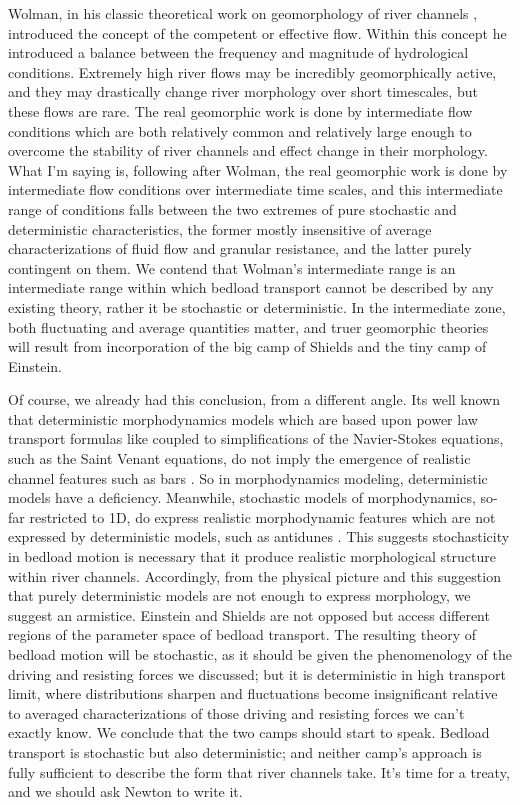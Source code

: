 \documentclass{article}
\begin{document}
Wolman, in his classic theoretical work on geomorphology of river channels \citep{Wolman1968}, introduced the concept of the competent or effective flow. 
Within this concept he introduced a balance between the frequency and magnitude of hydrological conditions. 
Extremely high river flows may be incredibly geomorphically active, and they may drastically change river morphology over short timescales, but these flows are rare. 
The real geomorphic work is done by intermediate flow conditions which are both relatively common and relatively large enough to overcome the stability of river channels and effect change in their morphology. 
What I'm saying is, following after Wolman, the real geomorphic work is done by intermediate flow conditions over intermediate time scales, and this intermediate range of conditions falls between the two extremes of pure stochastic and deterministic characteristics, the former mostly insensitive of average characterizations of fluid flow and granular resistance, and the latter purely contingent on them. 
We contend that Wolman's intermediate range is an intermediate range within which bedload transport cannot be described by any existing theory, rather it be stochastic or deterministic.  
In the intermediate zone, both fluctuating and average quantities matter, and truer geomorphic theories will result from incorporation of the big camp of Shields and the tiny camp of Einstein. 

Of course, we already had this conclusion, from a different angle. 
Its well known that deterministic morphodynamics models which are based upon power law transport formulas like \citet{MeyerPeter1948} coupled to simplifications of the Navier-Stokes equations, such as the Saint Venant equations, do not imply the emergence of realistic channel features such as bars \citep{Jerolmack2005}.
So in morphodynamics modeling, deterministic models have a deficiency. 
Meanwhile, stochastic models of morphodynamics, so-far restricted to 1D, do express realistic morphodynamic features which are not expressed by deterministic models, such as antidunes \citep{Bohorquez2018}. 
This suggests stochasticity in bedload motion is necessary that it produce realistic morphological structure within river channels. 
Accordingly, from the physical picture and this suggestion that purely deterministic models are not enough to express morphology, we suggest an armistice. 
Einstein and Shields are not opposed but access different regions of the parameter space of bedload transport. 
The resulting theory of bedload motion will be stochastic, as it should be given the phenomenology of the driving and resisting forces we discussed; but it is deterministic in high transport limit, where distributions sharpen and fluctuations become insignificant relative to averaged characterizations of those driving and resisting forces we can't exactly know. 
We conclude that the two camps should start to speak. Bedload transport is stochastic but also deterministic; and neither camp's approach is fully sufficient to describe the form that river channels take. 
It's time for a treaty, and we should ask Newton to write it.


\end{document}
